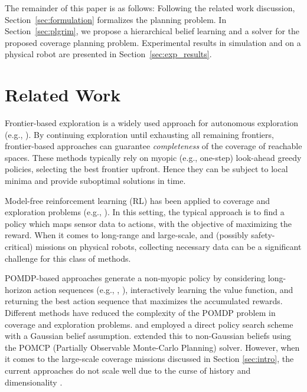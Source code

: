\documentclass[letterpaper]{article} %
\newcommand{\phdone}[1]{} %
\begin{document}
\phdone{Outline}
The remainder of this paper is as follows: Following the related work discussion, Section~\ref{sec:formulation} formalizes the planning problem. In Section~\ref{sec:plgrim}, we propose a hierarchical belief learning and a solver for the proposed coverage planning problem. Experimental results in simulation and on a physical robot are presented in Section~\ref{sec:exp_results}.%


\section{Related Work}\label{sec:related_work}
\phdone{Coverage--Frontier-based exploration}
Frontier-based exploration is a widely used approach for autonomous exploration (e.g., \cite{yamauchi1997frontier,tao2007motion,keidar2012robot,heng2015efficient,gonzalez2002navigation,grabowski2003autonomous}). By continuing exploration until exhausting all remaining frontiers, frontier-based approaches can guarantee \textit{completeness} of the coverage of reachable spaces.  These methods typically rely on myopic (e.g., one-step) look-ahead greedy policies, selecting the best frontier upfront. Hence they can be subject to local minima and provide suboptimal solutions in time.

\phdone{Coverage--(Model-free) RL-based approaches}
Model-free reinforcement learning (RL) has been applied to coverage and exploration problems (e.g., \cite{pathak_icm, rnd,burda2018study,ECR2018}). In this setting, the typical approach is to find a policy which maps sensor data to actions, with the objective of maximizing the reward. When it comes to long-range and large-scale, and (possibly safety-critical) missions on physical robots, collecting necessary data can be a significant challenge for this class of methods.

\phdone{Coverage--(Model-based RL) POMDP approaches}
POMDP-based approaches generate a non-myopic policy by considering long-horizon action sequences (e.g., \cite{kurniawati2011motion}, \cite{bai2015intention}), interactively learning the value function, and returning the best action sequence that maximizes the accumulated rewards. Different methods have reduced the complexity of the POMDP problem in coverage and exploration problems. \citet{indelman2015planning} and \citet{martinez2009bayesian} employed a direct policy search scheme with a Gaussian belief assumption. \citet{Lauri2016planning} extended this to non-Gaussian beliefs using the POMCP (Partially Observable Monte-Carlo Planning) solver. %
However, when it comes to the large-scale coverage missions discussed in Section \ref{sec:intro}, the current approaches do not scale well due to the curse of history and dimensionality \cite{Pineau03}.
\end{document}
